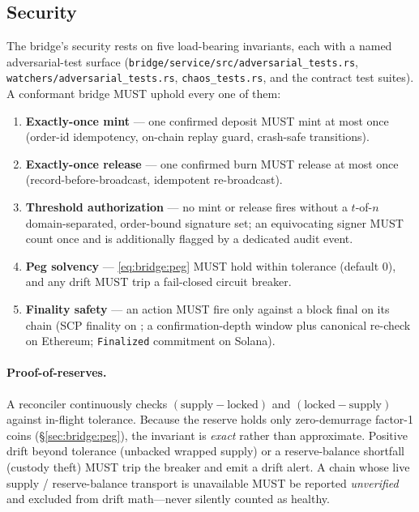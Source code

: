 \subsection{Security}
\label{sec:bridge:security}

The bridge's security rests on five load-bearing invariants, each with a named
adversarial-test surface (\texttt{bridge/service/src/adversarial\_tests.rs},
\texttt{watchers/adversarial\_tests.rs}, \texttt{chaos\_tests.rs}, and the
contract test suites). A conformant bridge MUST uphold every one of them:
\begin{enumerate}
  \item \textbf{Exactly-once mint} --- one confirmed deposit MUST mint at most
    once (order-id idempotency, on-chain replay guard, crash-safe transitions).
  \item \textbf{Exactly-once release} --- one confirmed burn MUST release at most
    once (record-before-broadcast, idempotent re-broadcast).
  \item \textbf{Threshold authorization} --- no mint or release fires without a
    $t$-of-$n$ domain-separated, order-bound signature set; an equivocating
    signer MUST count once and is additionally flagged by a dedicated audit
    event.
  \item \textbf{Peg solvency} --- \eqref{eq:bridge:peg} MUST hold within
    tolerance (default $0$), and any drift MUST trip a fail-closed circuit
    breaker.
  \item \textbf{Finality safety} --- an action MUST fire only against a block
    final on its chain (SCP finality on \BTH; a confirmation-depth window plus
    canonical re-check on Ethereum; \texttt{Finalized} commitment on Solana).
\end{enumerate}

\paragraph{Proof-of-reserves.} A reconciler continuously checks
$(\text{supply} - \text{locked})$ and $(\text{locked} - \text{supply})$ against
in-flight tolerance. Because the reserve holds only zero-demurrage factor-1
coins (\S\ref{sec:bridge:peg}), the invariant is \emph{exact} rather than
approximate. Positive drift beyond tolerance (unbacked wrapped supply) or a
reserve-balance shortfall (custody theft) MUST trip the breaker and emit a drift
alert. A chain whose live supply / reserve-balance transport is unavailable MUST
be reported \emph{unverified} and excluded from drift math---never silently
counted as healthy.

